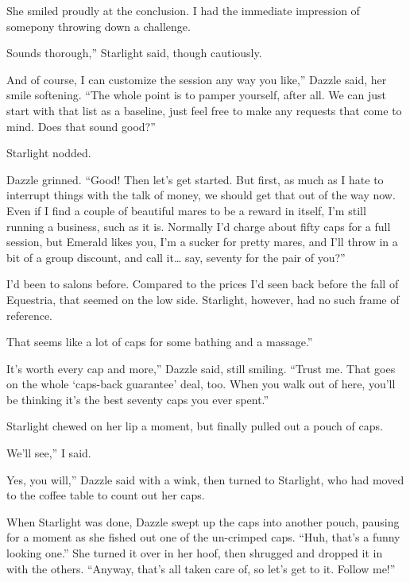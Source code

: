 She smiled proudly at the conclusion. I had the immediate impression of somepony throwing down a challenge.

\leavevmode{}Sounds thorough,” Starlight said, though cautiously.

\leavevmode{}And of course, I can customize the session any way you like,” Dazzle said, her smile softening. “The whole point is to pamper yourself, after all. We can just start with that list as a baseline, just feel free to make any requests that come to mind. Does that sound good?”

Starlight nodded.

Dazzle grinned. “Good! Then let’s get started. But first, as much as I hate to interrupt things with the talk of money, we should get that out of the way now. Even if I find a couple of beautiful mares to be a reward in itself, I’m still running a business, such as it is. Normally I’d charge about fifty caps for a full session, but Emerald likes you, I’m a sucker for pretty mares, and I’ll throw in a bit of a group discount, and call it… say, seventy for the pair of you?”

I’d been to salons before. Compared to the prices I’d seen back before the fall of Equestria, that seemed on the low side. Starlight, however, had no such frame of reference.

\leavevmode{}That seems like a lot of caps for some bathing and a massage.”

\leavevmode{}It’s worth every cap and more,” Dazzle said, still smiling. “Trust me. That goes on the whole ‘caps-back guarantee’ deal, too. When you walk out of here, you’ll be thinking it’s the best seventy caps you ever spent.”

Starlight chewed on her lip a moment, but finally pulled out a pouch of caps.

\leavevmode{}We’ll see,” I said.

\leavevmode{}Yes, you will,” Dazzle said with a wink, then turned to Starlight, who had moved to the coffee table to count out her caps.

When Starlight was done, Dazzle swept up the caps into another pouch, pausing for a moment as she fished out one of the un-crimped caps. “Huh, that’s a funny looking one.” She turned it over in her hoof, then shrugged and dropped it in with the others. “Anyway, that’s all taken care of, so let’s get to it. Follow me!”

